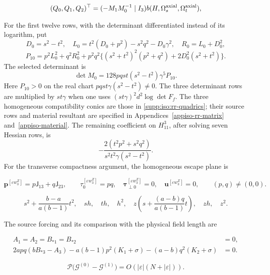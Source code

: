 \begin{equation}\label{supp:iso:rr-quadrics}
 (Q_0,Q_1,Q_2)^{\top}=(-M_1M_0^{-1}\mid I_3)b(H,\Omega_s^{\rm axial},\Omega_t^{\rm axial}),
\end{equation}

For the first twelve rows, with the determinant differentiated
instead of its logarithm, put
\[
 D_0=s^2-t^2,\quad
 L_0=t^2(D_0+p^2)-s^2q^2-D_0\gamma^2,\quad R_0=L_0+D_0^2,
\]
\[
 P_{10}=p^2L_0^2+q^2R_0^2+
 p^2q^2\{(s^2+t^2)^2(p^2+q^2)+2D_0^2(s^2+t^2)\}.
\]
The selected determinant is
\[
 \det M_0=128pqst(s^2-t^2)\gamma^5P_{10}.
\]
Here $P_{10}>0$ on the real chart $pqst\gamma(s^2-t^2)\ne0$.
The three determinant rows are multiplied by $st\gamma$ when
one uses $(st\gamma)^2d^2\log\det F_f$.
The three homogeneous compatibility conics are those in
\eqref{supp:iso:rr-quadrics}; their source rows and material resultant
are specified in Appendices~\ref{appiso-rr-matrix}
and~\ref{appiso-material}. The remaining coefficient on
$H_{11}^3$, after solving seven Hessian rows, is
\[
 -\frac{2(t^2p^2+s^2q^2)}{s^2t^2\gamma(s^2-t^2)}.
\]
For the transverse compactness argument, the homogeneous escape plane is

\begin{equation}\label{supp:iso:escape-plane}
 \boldsymbol p^{[\varepsilon w_3^Z]}=p\mathsf J_{13}+q\mathsf J_{23},\qquad \tau_0^{[\varepsilon w_3^Z]}=pq,\quad \boldsymbol\tau_{\perp0}^{[\varepsilon w_3^Z]}=0,\quad \boldsymbol u^{[\varepsilon w_3^Z]}=0,
 \qquad(p,q)\ne(0,0).
\end{equation}

\begin{equation}\label{supp:iso:normal-seven}
 s^2+\frac{b-a}{a(b-1)}t^2,\quad sh,\quad th,\quad h^2,
 \quad z\left(s+\frac{(a-b)q}{a(b-1)}t\right),\quad zh,\quad z^2.
\end{equation}

The source forcing and its comparison with the physical field
length are

\begin{align}
 A_1=A_2=B_{*1}=B_{*2}&=0,\label{supp:iso:forcing-kernel}\\
 2apq(bB_{*3}-A_3)-a(b-1)p^2(K_1+\sigma)
                         -(a-b)q^2(K_2+\sigma)&=0.
\end{align}

\begin{equation}\label{supp:iso:compact-comparison}
 \mathcal P\bigl(\boldsymbol{\mathcal G}^{(0)}-\boldsymbol{\mathcal G}^{(1)}\bigr)=O(|\varepsilon|(N+|\varepsilon|)).
\end{equation}

